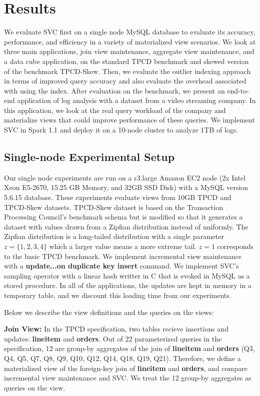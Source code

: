 \vspace{-.5em}
\section{Results}
\label{exp}
We evaluate SVC first on a single node MySQL database to evaluate its accuracy, performance, and efficiency in a variety of materialized view 
scenarios.
We look at three main applications, join view maintenance, aggregate view maintenance, and a data cube application, on the standard TPCD benchmark 
and skewed version of the benchmark TPCD-Skew.
Then, we evaluate the outlier indexing approach in terms of improved query accuracy and also evaluate the overhead associated with using the index.
After evaluation on the benchmark, we present an end-to-end application of log analysis with a dataset from a video streaming company.
In this application, we look at the real query workload of the company and materialize views that could improve performance of these queries.
We implement SVC in Spark 1.1 and deploy it on a 10-node cluster to analyze 1TB of logs.

\subsection{Single-node Experimental Setup}
Our single node experiments are run on a r3.large Amazon EC2 node (2x Intel Xeon E5-2670, 15.25 GB Memory, and 32GB SSD Disk) with a MySQL version 5.6.15 database.
These experiments evaluate views from 10GB TPCD and TPCD-Skew datasets.
TPCD-Skew dataset \cite{tpcdskew} is based on the Transaction Processing Council's benchmark
schema but is modified so that it generates a dataset with values drawn from a Zipfian distribution instead of uniformly.
The Zipfian distribution \cite{mitzenmacher2004brief} is a long-tailed distribution with a single parameter $z=\{1,2,3,4\}$ which a larger
value means a more extreme tail.
$z=1$ corresponds to the basic TPCD benchmark. 
We implement incremental view maintenance with a \textbf{update...on duplicate key insert} command.
We implement SVC's sampling operator with a linear hash writter in C that is evoked in MySQL as a stored procedure.
In all of the applications, the updates are kept in memory in a temporary table, and we discount this loading time from our experiments.

Below we describe the view definitions and the queries on the views:

\textbf{Join View: } In the TPCD specification, two tables recieve insertions and updates: \textbf{lineitem} and \textbf{orders}.
Out of 22 parameterized queries in the specification, 12 are group-by aggregates of the join of \textbf{lineitem} and \textbf{orders} (Q3, Q4, Q5, Q7, Q8, Q9, Q10, Q12, Q14, Q18, Q19, Q21).
Therefore, we define a materialized view of the foreign-key join of \textbf{lineitem} and \textbf{orders}, and compare incremental view maintenance and SVC.
We treat the 12 group-by aggregates as queries on the view.

